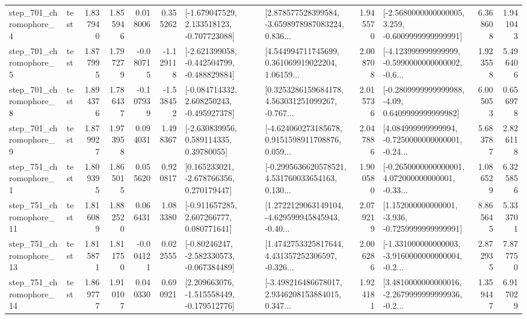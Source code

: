 \begin{tabular}{llrrrrllrlrr}
   step\_701\_chromophore\_4 &      test &      1.837940 &    1.855946 &      0.018006 &  0.355262 &   [-1.679047529, 2.133518123, -0.707723088] &  [2.878577528399584, -3.6598978987083224, 0.836... &       1.945570 &  [-2.5680000000000005, 3.259, -0.6009999999999991] &            6.368608 &          1.941043 \\
   step\_701\_chromophore\_5 &      test &      1.877995 &    1.797279 &     -0.080715 & -1.129118 &  [-2.621399058, -0.442504799, -0.488829884] &  [4.544994711745699, 0.361069919022204, 1.06159... &       2.008708 &  [-4.123999999999999, -0.5990000000000002, -0.6... &            1.923558 &          5.496406 \\
   step\_701\_chromophore\_8 &      test &      1.894376 &    1.786437 &     -0.107939 & -1.538452 &   [-0.084714332, 2.608250243, -0.495927378] &  [0.3253286159684178, 4.563031251099267, -0.767... &       2.015736 &   [-0.2809999999999988, -4.09, 0.6409999999999982] &            6.005053 &          0.656978 \\
   step\_701\_chromophore\_9 &      test &      1.879927 &    1.973958 &      0.094031 &  1.498367 &     [-2.630839956, 0.589114335, 0.39780055] &  [-4.624060273185678, 0.9151598911708876, 0.059... &       2.047886 &  [4.084999999999994, -0.7250000000000001, -0.24... &            5.683787 &          2.826118 \\
   step\_751\_chromophore\_1 &      test &      1.809395 &    1.865015 &      0.055620 &  0.920817 &    [0.165233021, -2.678766356, 0.270179447] &  [-0.2995636620578521, 4.531760033654163, 0.130... &       1.900580 &  [-0.2650000000000001, 4.072000000000001, -0.33... &            1.086529 &          6.325856 \\
  step\_751\_chromophore\_11 &      test &      1.816089 &    1.882520 &      0.066431 &  1.083380 &    [-0.911657285, 2.607266777, 0.080771641] &  [1.2722129063149104, -4.629599945845943, -0.40... &       2.079219 &   [1.152000000000001, -3.936, -0.7259999999999991] &            8.865645 &          5.333701 \\
  step\_751\_chromophore\_13 &      test &      1.815871 &    1.811750 &     -0.004121 &  0.022555 &   [-0.80246247, -2.582330573, -0.067384489] &  [1.4742753325817644, 4.431357252306597, -0.326... &       2.006286 &  [-1.331000000000003, -3.9160000000000004, -0.2... &            2.872935 &          7.877750 \\
  step\_751\_chromophore\_14 &      test &      1.869777 &    1.910107 &      0.040330 &  0.690921 &   [2.209663076, -1.515558449, -0.179512776] &  [-3.498216486678017, 2.9346208153884015, 0.347... &       1.924181 &  [3.4810000000000016, -2.2679999999999936, -0.2... &            1.359447 &          6.917029 \\

\end{tabular}

